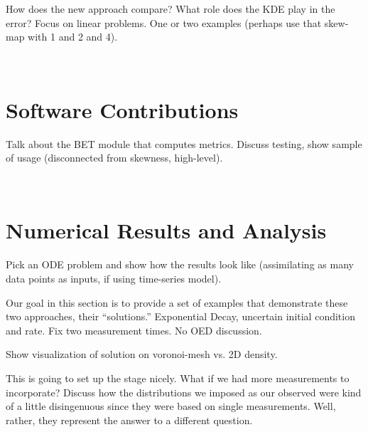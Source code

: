 How does the new approach compare? What role does the KDE play in the error?
Focus on linear problems. One or two examples (perhaps use that skew-map with 1 and 2 and 4).

\
\section{Software Contributions}

Talk about the BET module that computes metrics.
Discuss testing, show sample of usage (disconnected from skewness, high-level).

\
\section{Numerical Results and Analysis}

Pick an ODE problem and show how the results look like (assimilating as many data points as inputs, if using time-series model). 

Our goal in this section is to provide a set of examples that demonstrate these two approaches, their ``solutions.''
Exponential Decay, uncertain initial condition and rate. Fix two measurement times. No OED discussion.

Show visualization of solution on voronoi-mesh vs. 2D density. 

This is going to set up the stage nicely.
What if we had more measurements to incorporate? Discuss how the distributions we imposed as our observed were kind of a little disingenuous since they were based on single measurements. Well, rather, they represent the answer to a different question.

